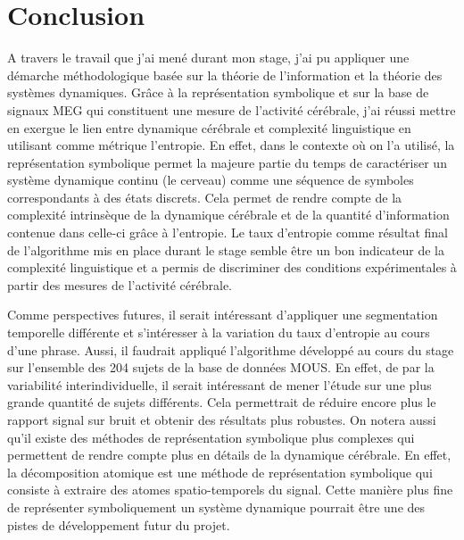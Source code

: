 \chapter*{Conclusion}

A travers le travail que j'ai mené durant mon stage, j'ai pu appliquer une démarche méthodologique basée sur la théorie de l'information et la théorie des systèmes dynamiques. Grâce à la représentation symbolique et sur la base de signaux MEG qui constituent une mesure de l'activité cérébrale, j'ai réussi mettre en exergue le lien entre dynamique cérébrale et complexité linguistique en utilisant comme métrique l'entropie. En effet, dans le contexte où on l'a utilisé, la représentation symbolique permet la majeure partie du temps de caractériser un système dynamique continu (le cerveau) comme une séquence de symboles correspondants à des états discrets. Cela permet de rendre compte de la complexité intrinsèque de la dynamique cérébrale et de la quantité d'information contenue dans celle-ci grâce à l'entropie. Le taux d'entropie comme résultat final de l'algorithme mis en place durant le stage semble être un bon indicateur de la complexité linguistique et a permis de discriminer des conditions expérimentales à partir des mesures de l'activité cérébrale. 

Comme perspectives futures, il serait intéressant d'appliquer une segmentation temporelle différente et s'intéresser à la variation du taux d'entropie au cours d'une phrase. Aussi, il faudrait appliqué l'algorithme développé au cours du stage sur l'ensemble des 204 sujets de la base de données MOUS. En effet, de par la variabilité interindividuelle, il serait intéressant de mener l'étude sur une plus grande quantité de sujets différents. Cela permettrait de réduire encore plus le rapport signal sur bruit et obtenir des résultats plus robustes. On notera aussi qu'il existe des méthodes de représentation symbolique plus complexes qui permettent de rendre compte plus en détails de la dynamique cérébrale. En effet, la décomposition atomique \cite{7} est une méthode de représentation symbolique qui consiste à extraire des atomes spatio-temporels du signal. Cette manière plus fine de représenter symboliquement un système dynamique pourrait être une des pistes de développement futur du projet.
